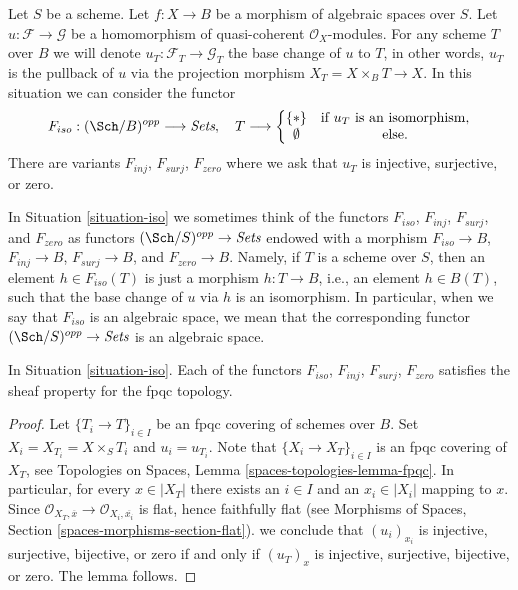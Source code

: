 \begin{situation}
\label{situation-iso}
Let $S$ be a scheme.
Let $f : X \to B$ be a morphism of algebraic spaces over $S$.
Let $u : \mathcal{F} \to \mathcal{G}$ be a homomorphism of
quasi-coherent $\mathcal{O}_X$-modules. For any scheme $T$ over
$B$ we will denote $u_T : \mathcal{F}_T \to \mathcal{G}_T$ the
base change of $u$ to $T$, in other words, $u_T$ is the pullback
of $u$ via the projection morphism $X_T = X \times_B T \to X$.
In this situation we can consider the functor
\begin{equation}
\label{equation-iso}
F_{iso} : (\Sch/B)^{opp} \longrightarrow \textit{Sets}, \quad
T \longrightarrow \left\{
\begin{matrix}
\{*\} & \text{if }u_T\text{ is an isomorphism}, \\
\emptyset & \text{else.}
\end{matrix}
\right.
\end{equation}
There are variants $F_{inj}$, $F_{surj}$, $F_{zero}$ where we ask that
$u_T$ is injective, surjective, or zero.
\end{situation}

\noindent
In Situation \ref{situation-iso} we sometimes think of the functors
$F_{iso}$, $F_{inj}$, $F_{surj}$, and $F_{zero}$ as functors
$(\Sch/S)^{opp} \to \textit{Sets}$ endowed with a morphism
$F_{iso} \to B$, $F_{inj} \to B$, $F_{surj} \to B$, and $F_{zero} \to B$.
Namely, if $T$ is a scheme over $S$, then an element $h \in F_{iso}(T)$
is just a morphism $h : T \to B$, i.e., an element $h \in B(T)$,
such that the base change of $u$ via $h$ is an isomorphism.
In particular, when we say
that $F_{iso}$ is an algebraic space, we mean that the corresponding
functor $(\Sch/S)^{opp} \to \textit{Sets}$ is an algebraic space.

\begin{lemma}
\label{lemma-iso-sheaf}
In Situation \ref{situation-iso}.
Each of the functors $F_{iso}$, $F_{inj}$, $F_{surj}$, $F_{zero}$
satisfies the sheaf property for the fpqc topology.
\end{lemma}

\begin{proof}
Let $\{T_i \to T\}_{i \in I}$ be an fpqc covering of schemes over $B$.
Set $X_i = X_{T_i} = X \times_S T_i$ and $u_i = u_{T_i}$.
Note that $\{X_i \to X_T\}_{i \in I}$ is an fpqc covering of $X_T$, see
Topologies on Spaces, Lemma \ref{spaces-topologies-lemma-fpqc}.
In particular, for every $x \in |X_T|$ there exists an $i \in I$
and an $x_i \in |X_i|$ mapping to $x$. Since
$\mathcal{O}_{X_T, \overline{x}} \to \mathcal{O}_{X_i, \overline{x_i}}$
is flat, hence faithfully flat (see
Morphisms of Spaces, Section \ref{spaces-morphisms-section-flat}).
we conclude that $(u_i)_{x_i}$ is injective, surjective, bijective, or zero
if and only if $(u_T)_x$ is injective, surjective, bijective, or zero.
The lemma follows.
\end{proof}

